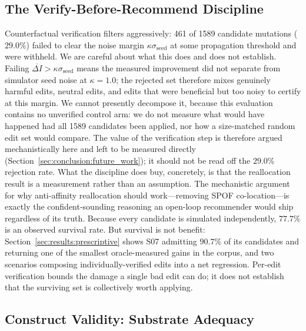 \subsection{The Verify-Before-Recommend Discipline}
\label{sec:disc:verify}

Counterfactual verification filters aggressively: 461 of 1589 candidate mutations ($29.0\%$) failed to clear the noise margin $\kappa\sigma_{\text{seed}}$ at some propagation threshold and were withheld. We are careful about what this does and does not establish. Failing $\overline{\Delta I} > \kappa\sigma_{\text{seed}}$ means the measured improvement did not separate from simulator seed noise at $\kappa = 1.0$; the rejected set therefore mixes genuinely harmful edits, neutral edits, and edits that were beneficial but too noisy to certify at this margin. We cannot presently decompose it, because this evaluation contains no unverified control arm: we do not measure what would have happened had all 1589 candidates been applied, nor how a size-matched random edit set would compare. The value of the verification step is therefore argued mechanistically here and left to be measured directly (Section~\ref{sec:conclusion:future_work}); it should not be read off the $29.0\%$ rejection rate. What the discipline does buy, concretely, is that the reallocation result is a measurement rather than an assumption. The mechanistic argument for why anti-affinity reallocation should work---removing SPOF co-location---is exactly the confident-sounding reasoning an open-loop recommender would ship regardless of its truth. Because every candidate is simulated independently, $77.7\%$ is an observed survival rate. But survival is not benefit: Section~\ref{sec:results:prescriptive} shows S07 admitting $90.7\%$ of its candidates and returning one of the smallest oracle-measured gains in the corpus, and two scenarios composing individually-verified edits into a net regression. Per-edit verification bounds the damage a single bad edit can do; it does not establish that the surviving set is collectively worth applying.

\subsection{Construct Validity: Substrate Adequacy}
\label{sec:disc:substrate}

